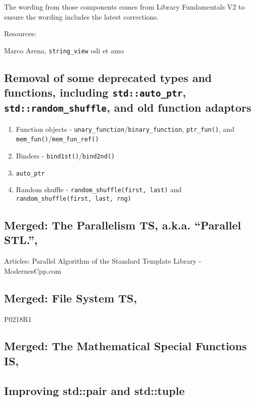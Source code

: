 The wording from those components comes from Library Fundamentals V2 to ensure the wording includes the latest corrections.

Resources:

Marco Arena, \texttt{string_view} odi et amo

\subsection{Removal of some deprecated types and functions, including \texttt{std::auto_ptr}, \texttt{std::random_shuffle}, and old function adaptors}

\begin{enumerate}
    \item Function objects - \texttt{unary_function}/\texttt{binary_function}, \texttt{ptr_fun()}, and \texttt{mem_fun()}/\texttt{mem_fun_ref()}
    \item Binders - \texttt{bind1st()}/\texttt{bind2nd()}
    \item \texttt{auto_ptr}
    \item Random shuffle - \texttt{random_shuffle(first, last)} and \texttt{random_shuffle(first, last, rng)}
\end{enumerate}

\subsection{Merged: The Parallelism TS, a.k.a. “Parallel STL.”,}

Articles:
Parallel Algorithm of the Standard Template Library - ModernesCpp.com

\subsection{Merged: File System TS,}

P0218R1

\subsection{Merged: The Mathematical Special Functions IS,}

\subsection{Improving std::pair and std::tuple}

